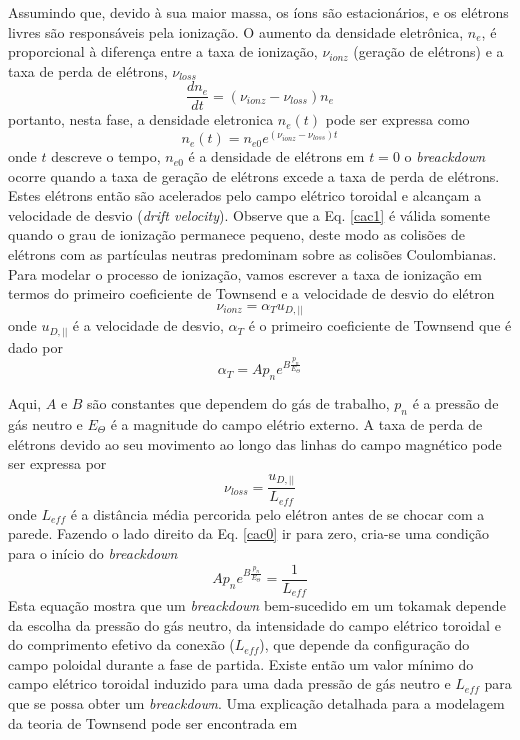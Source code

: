 \documentclass[12pt,oneside,a4paper]{abntex2}
\theoremstyle{definition}  %
\begin{document}
Assumindo que, devido à sua maior massa, os íons são estacionários, e os elétrons livres são responsáveis pela ionização.  O aumento da densidade eletrônica, $n_e$, é proporcional à diferença entre a taxa de ionização, $\nu_{ionz}$ (geração de elétrons) e a taxa de perda de elétrons, $\nu_{loss}$
\begin{equation}
\dfrac{dn_e}{dt} = (\nu_{ionz}-\nu_{loss})n_e
\label{cac0}
\end{equation}
portanto, nesta fase, a densidade eletronica $n_e(t)$ pode ser expressa como
\begin{equation}
n_e(t) = n_{e0} e^{(\nu_{ionz}-\nu_{loss})t}
\label{cac1}
\end{equation}
onde $t$ descreve o tempo, $n_{e0}$ é a densidade de elétrons em $t=0$ o \textit{breackdown} ocorre quando a taxa de geração de elétrons excede a taxa de perda de elétrons. Estes elétrons então são acelerados pelo campo elétrico toroidal e alcançam a velocidade de desvio (\textit{drift velocity}). Observe que a Eq. \ref{cac1} é válida somente quando o grau de ionização permanece pequeno, deste modo as colisões de elétrons com as partículas neutras predominam sobre as colisões Coulombianas. Para modelar o processo de ionização, vamos escrever a taxa de ionização em termos do primeiro coeficiente de Townsend e a velocidade de desvio do elétron 
\begin{equation}
\nu_{ionz} = \alpha_T u_{D,||}
\end{equation} 
onde $u_{D, ||}$ é a velocidade de desvio, $\alpha_T$ é o primeiro coeficiente de Townsend que é dado por
\begin{equation}
\alpha_T = A p_n e^{B \frac{p_n}{E_\Theta}}
\end{equation}

Aqui, $A$ e $B$ são constantes que dependem do gás de trabalho, $p_n$ é a pressão de gás neutro e  $E_\Theta$ é a magnitude do campo elétrio externo. A taxa de perda de elétrons devido ao seu movimento ao longo das linhas do campo magnético pode ser expressa por
\begin{equation}
\nu_{loss} = \frac{u_{D,||}}{L_{eff}}
\end{equation}
onde $L_{eff}$ é a distância média percorida pelo elétron antes de se chocar com a parede. Fazendo o lado direito da Eq. \ref{cac0} ir para zero, cria-se uma condição para o início do \textit{breackdown}
\begin{equation}
A p_n e^{B \frac{p_n}{E_\Theta}} = \frac{1}{L_{eff}}
\end{equation}
Esta equação mostra que um \textit{breackdown} bem-sucedido em um tokamak depende da escolha da pressão do gás neutro, da intensidade do campo elétrico toroidal e do comprimento efetivo da conexão ($L_{eff}$), que depende da configuração do campo poloidal durante a fase de partida. Existe então um valor mínimo do campo elétrico toroidal induzido para uma dada pressão de gás neutro e $L_{eff}$ para que se possa obter um \textit{breackdown}. Uma explicação detalhada para a modelagem da teoria de Townsend pode ser encontrada em \cite{yoo2014ohmic}
 
\end{document}
